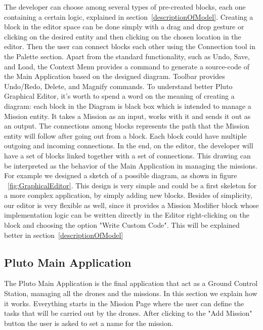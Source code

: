 The developer can choose among several types of pre-created blocks, each one containing a certain logic, explained in section~\ref{descriptionOfModel}. Creating a block in the editor space can be done simply with a drag and drop gesture or clicking on the desired entity and then clicking on the chosen location in the editor. Then the user can connect blocks each other using the Connection tool in the Palette section.
Apart from the standard functionality, such as Undo, Save, and Load, the Context Menu provides a command to generate a source-code of the Main Application based on the designed diagram. Toolbar provides Undo/Redo, Delete, and Magnify commands.
To understand better Pluto Graphical Editor, it's worth to spend a word on the meaning of creating a diagram: each block in the Diagram is black box which is intended to manage a Mission entity. It takes a Mission as an input, works with it and sends it out as an output. The connections among blocks represents the path that the Mission entity will follow after going out from a block. Each block could have multiple outgoing and incoming connections.
In the end, on the editor, the developer will have a set of blocks linked together with a set of connections. This drawing can be interpreted as the behavior of the Main Application in managing the missions. For example we designed a sketch of a possible diagram, as shown in figure ~\ref{fig:GraphicalEditor}. This design is very simple and could be a first skeleton for a more complex application, by simply adding new blocks.
Besides of simplicity, our editor is very flexible as well, since it provides a Mission Modifier block whose implementation logic can be written directly in the Editor right-clicking on the block and choosing the option "Write Custom Code". This will be explained better in section~\ref{descriptionOfModel}

\subsection{Pluto Main Application}
\label{plutoMainApp}

The Pluto Main Application is the final application that act as a Ground Control Station, managing all the drones and the missions. In this section we explain how it works.
Everything starts in the Mission Page where the user can define the tasks that will be carried out by the drones. After clicking to the "Add Mission" button the user is asked to set a name for the mission.

